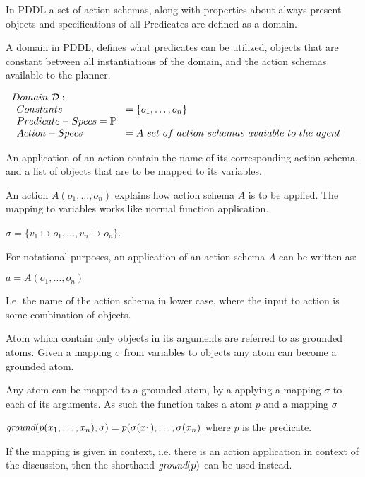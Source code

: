 \documentclass[../Master.tex]{subfiles}
\begin{document}
In PDDL a set of action schemas, along with properties about always present objects and specifications of all Predicates are defined as a domain.

\begin{definition} A domain in PDDL, defines what predicates can be utilized, objects that are constant between all instantiations of the domain, and the action schemas available to the planner.
	
$
\begin{array}{ll}
Domain~\mathcal{D}: & \\

\begin{array}{ll}
Constants & = \{o_1,\dots,o_n\}			 \\  
Predicate-Specs = \preds \\
Action-Specs & = A~set~of~action~schemas~avaiable~to~the~agent \\
\end{array}
\end{array}$
\end{definition}


	

An application of an action contain the name of its corresponding action schema, and a list of objects that are to be mapped to its variables.
\begin{definition} 
	An action $A(o_1,\dots,o_n)$ explains how action schema $A$ is to be applied. The mapping to variables works like normal function application. 
	
	$\sigma = \{ v_1 \mapsto o_1,\dots,v_n \mapsto o_n \}$.
	
	For notational purposes, an application of an action schema $A$ can be written as:
	
	$a = A(o_1,\dots,o_n)$ 
	
	I.e. the name of the action schema in lower case, where the input to action is some combination of objects.
	
	
	
\end{definition}


Atom which contain only objects in its arguments are referred to as grounded atoms. Given a mapping $\sigma$ from variables to objects any atom can become a grounded atom.
\begin{definition} 
	Any atom can be mapped to a grounded atom, by a applying a mapping $\sigma$ to each of its arguments. As such the \ground function takes a atom $p$ and a mapping $\sigma$
	
		$\textit{ground}(p(x_1,\dots,x_n),\sigma) = p(\sigma(x_1),\dots,\sigma(x_n)$ where $p$ is the predicate.
		
	If the mapping is given in context, i.e. there is an action application in context of the discussion, then the shorthand $\textit{ground}(p)$ can be used instead.
\end{definition}
\end{document}
